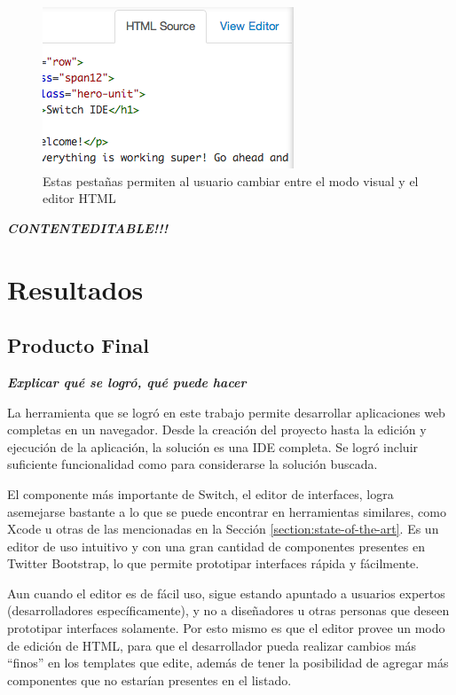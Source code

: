 \documentclass[12pt,titlepage,]{article}
\makeatletter
\def\maxwidth{\ifdim\Gin@nat@width>\linewidth\linewidth
\else\Gin@nat@width\fi}
\let\Oldincludegraphics\includegraphics
\renewcommand{\includegraphics}[1]{\Oldincludegraphics[width=\maxwidth]{#1}}
\makeatother
\begin{document}
\begin{figure}[htbp]
\centering
\includegraphics{figures/html-editor.png}
\caption{Estas pestañas permiten al usuario cambiar entre el modo visual
y el editor HTML \label{figure:html-editor}}
\end{figure}

\textbf{\emph{CONTENTEDITABLE!!!}}

\clearpage
\newpage

\section{Resultados}

\subsection{Producto Final}

\textbf{\emph{Explicar qué se logró, qué puede hacer}}

La herramienta que se logró en este trabajo permite desarrollar
aplicaciones web completas en un navegador. Desde la creación del
proyecto hasta la edición y ejecución de la aplicación, la solución es
una IDE completa. Se logró incluir suficiente funcionalidad como para
considerarse la solución buscada.

El componente más importante de Switch, el editor de interfaces, logra
asemejarse bastante a lo que se puede encontrar en herramientas
similares, como Xcode u otras de las mencionadas en la Sección
\ref{section:state-of-the-art}. Es un editor de uso intuitivo y con una
gran cantidad de componentes presentes en Twitter Bootstrap, lo que
permite prototipar interfaces rápida y fácilmente.

Aun cuando el editor es de fácil uso, sigue estando apuntado a usuarios
expertos (desarrolladores específicamente), y no a diseñadores u otras
personas que deseen prototipar interfaces solamente. Por esto mismo es
que el editor provee un modo de edición de HTML, para que el
desarrollador pueda realizar cambios más ``finos'' en los templates que
edite, además de tener la posibilidad de agregar más componentes que no
estarían presentes en el listado.
\end{document}
